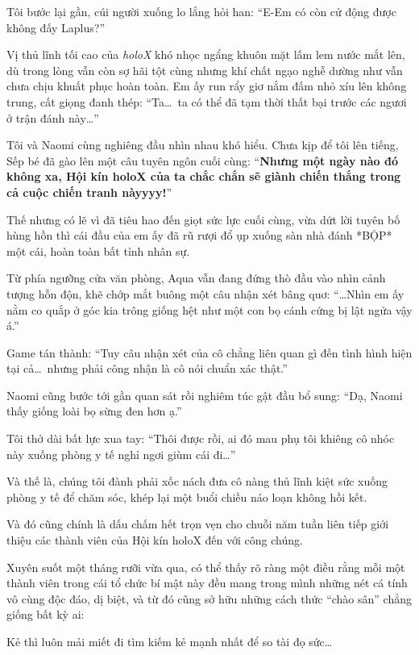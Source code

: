 \documentclass[../main.tex]{subfiles}
\begin{document}
Tôi bước lại gần, cúi người xuống lo lắng hỏi han: ``E-Em có còn cử động được không đấy Laplus?''

Vị thủ lĩnh tối cao của \textit{holoX} khó nhọc ngẩng khuôn mặt lấm lem nước mắt lên, dù trong lòng vẫn còn sợ hãi tột cùng nhưng khí chất ngạo nghễ dường như vẫn chưa chịu khuất phục hoàn toàn. Em ấy run rẩy giơ nắm đấm nhỏ xíu lên không trung, cất giọng đanh thép: ``Ta\dots\ ta có thể đã tạm thời thất bại trước các ngươi ở trận đánh này\dots''

Tôi và Naomi cùng nghiêng đầu nhìn nhau khó hiểu. Chưa kịp để tôi lên tiếng, Sếp bé đã gào lên một câu tuyên ngôn cuối cùng: ``\textbf{Nhưng một ngày nào đó không xa, Hội kín holoX của ta chắc chắn sẽ giành chiến thắng trong cả cuộc chiến tranh nàyyyy!}''

Thế nhưng có lẽ vì đã tiêu hao đến giọt sức lực cuối cùng, vừa dứt lời tuyên bố hùng hồn thì cái đầu của em ấy đã rũ rượi đổ ụp xuống sàn nhà đánh *BỘP* một cái, hoàn toàn bất tỉnh nhân sự.

Từ phía ngưỡng cửa văn phòng, Aqua vẫn đang đứng thò đầu vào nhìn cảnh tượng hỗn độn, khẽ chớp mắt buông một câu nhận xét bâng quơ: ``\dots Nhìn em ấy nằm co quắp ở góc kia trông giống hệt như một con bọ cánh cứng bị lật ngửa vậy á.''

Game tán thành: ``Tuy câu nhận xét của cô chẳng liên quan gì đến tình hình hiện tại cả\dots\ nhưng phải công nhận là cô nói chuẩn xác thật.''

Naomi cũng bước tới gần quan sát rồi nghiêm túc gật đầu bổ sung: ``Dạ, Naomi thấy giống loài bọ sừng đen hơn ạ.''

Tôi thở dài bất lực xua tay: ``Thôi được rồi, ai đó mau phụ tôi khiêng cô nhóc này xuống phòng y tế nghỉ ngơi giùm cái đi\dots''

Và thế là, chúng tôi đành phải xốc nách đưa cô nàng thủ lĩnh kiệt sức xuống phòng y tế để chăm sóc, khép lại một buổi chiều náo loạn không hồi kết.

\il

Và đó cũng chính là dấu chấm hết trọn vẹn cho chuỗi năm tuần liên tiếp giới thiệu các thành viên của Hội kín holoX đến với công chúng.

Xuyên suốt một tháng rưỡi vừa qua, có thể thấy rõ ràng một điều rằng mỗi một thành viên trong cái tổ chức bí mật này đều mang trong mình những nét cá tính vô cùng độc đáo, dị biệt, và từ đó cũng sở hữu những cách thức ``chào sân'' chẳng giống bất kỳ ai:

Kẻ thì luôn mải miết đi tìm kiếm kẻ mạnh nhất để so tài đọ sức\dots
\end{document}
